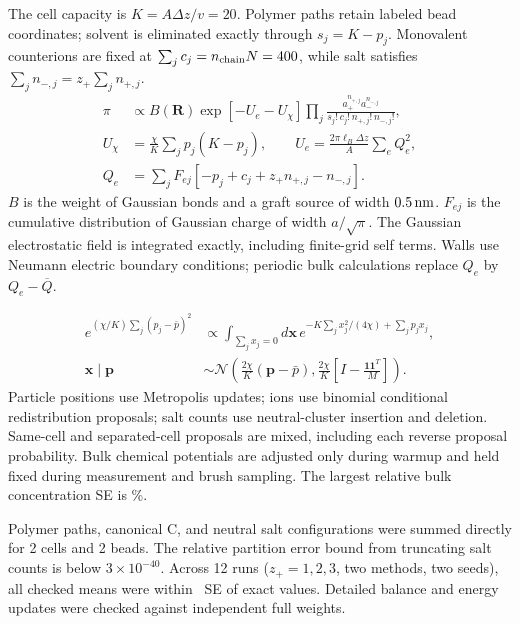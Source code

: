 \clearpage
{}
The cell capacity is $K=A\Delta z/v=20$. Polymer paths retain labeled bead coordinates;
solvent is eliminated exactly through $s_j=K-p_j$. Monovalent counterions are fixed at
$\sum_j c_j=n_{\rm chain}N=400$, while salt satisfies $\sum_j n_{-,j}=z_+\sum_j n_{+,j}$.
\begin{align*}
 \pi&\propto B(\bm R)\exp[-U_e-U_\chi]
 \prod_j\frac{a_+^{n_{+,j}}a_-^{n_{-,j}}}{s_j!\,c_j!\,n_{+,j}!\,n_{-,j}!},\\
 U_\chi&=\frac{\chi}{K}\sum_j p_j(K-p_j),\qquad
 U_e=\frac{2\pi\ell_B\Delta z}{A}\sum_e Q_e^2,\\
 Q_e&=\sum_jF_{ej}[-p_j+c_j+z_+n_{+,j}-n_{-,j}].
\end{align*}
$B$ is the weight of Gaussian bonds and a graft source of width $0.5\,\mathrm{nm}$.
$F_{ej}$ is the cumulative distribution of Gaussian charge of width $a/\sqrt\pi$. The Gaussian
electrostatic field is integrated exactly, including finite-grid self terms. Walls use Neumann electric boundary conditions;
periodic bulk calculations replace $Q_e$ by $Q_e-\overline Q$.

\begin{align*}
 e^{(\chi/K)\sum_j(p_j-\bar p)^2}
 &\propto\int_{\sum_jx_j=0}d\bm x\,
 e^{-K\sum_jx_j^2/(4\chi)+\sum_jp_jx_j},\\
 \bm x\mid\bm p&\sim\mathcal N\!\left(
 \frac{2\chi}{K}(\bm p-\bar p),\frac{2\chi}{K}
 \left[I-\frac{\bm1\bm1^T}{M}\right]\right).
\end{align*}
Particle positions use Metropolis updates; ions use binomial conditional redistribution proposals;
salt counts use neutral-cluster insertion and deletion. Same-cell and separated-cell proposals are mixed,
including each reverse proposal probability. Bulk chemical potentials are adjusted only during warmup
and held fixed during measurement and brush sampling. The largest relative bulk concentration SE is \SamplingBathRelativeSe\%.

Polymer paths, canonical C, and neutral salt configurations were summed directly for 2 cells and 2 beads.
The relative partition error bound from truncating salt counts is below $3\times10^{-40}$.
Across 12 runs ($z_+=1,2,3$, two methods, two seeds), all checked means were within
\SamplingTinySigma\ SE of exact values. Detailed balance and energy updates were checked against independent full weights.

